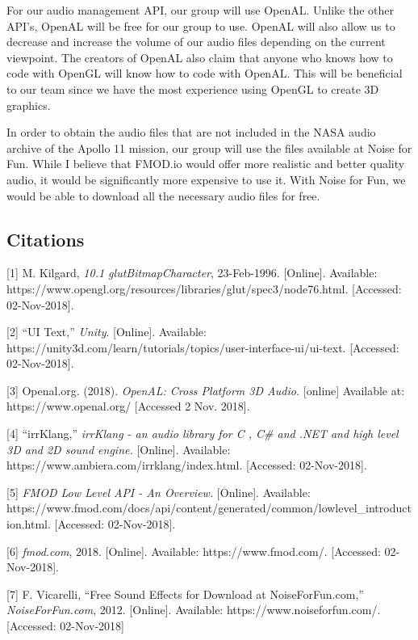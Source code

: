 \documentclass[onecolumn, draftclsnofoot,10pt, compsoc]{IEEEtran}
\begin{document}
For our audio management API, our group will use OpenAL. Unlike the other API's, OpenAL will be free for our group to use. OpenAL will also allow us to decrease and increase the volume of our audio files depending on the current viewpoint. The creators of OpenAL also claim that anyone who knows how to code with OpenGL will know how to code with OpenAL. This will be beneficial to our team since we have the most experience using OpenGL to create 3D graphics.

In order to obtain the audio files that are not included in the NASA audio archive of the Apollo 11 mission, our group will use the files available at Noise for Fun. While I believe that FMOD.io would offer more realistic and better quality audio, it would be significantly more expensive to use it. With Noise for Fun, we would be able to  download all the necessary audio files for free. 

\subsection{Citations}
[1] M. Kilgard, \textit{10.1 glutBitmapCharacter}, 23-Feb-1996. [Online]. 
\newline
Available: https://www.opengl.org/resources/libraries/glut/spec3/node76.html. [Accessed: 02-Nov-2018].

[2] “UI Text,” \textit{Unity}. [Online]. Available: https://unity3d.com/learn/tutorials/topics/user-interface-ui/ui-text. [Accessed: 02-Nov-2018].

[3] Openal.org. (2018). \textit{OpenAL: Cross Platform 3D Audio.} [online] Available at: https://www.openal.org/ [Accessed 2 Nov. 2018].
 
[4] “irrKlang,” \textit{irrKlang - an audio library for C , C\# and .NET and high level 3D and 2D sound engine.} [Online]. Available: https://www.ambiera.com/irrklang/index.html. [Accessed: 02-Nov-2018].

[5] \textit{FMOD Low Level API - An Overview.} [Online]. 
\newline
Available: https://www.fmod.com/docs/api/content/generated/common/lowlevel\_introduction.html. [Accessed: 02-Nov-2018].

[6] \textit{fmod.com}, 2018. [Online]. Available: https://www.fmod.com/. [Accessed: 02-Nov-2018].

[7] F. Vicarelli, “Free Sound Effects for Download at NoiseForFun.com,” \textit{NoiseForFun.com}, 2012. [Online]. Available: https://www.noiseforfun.com/. [Accessed: 02-Nov-2018]
\clearpage
\end{document}
